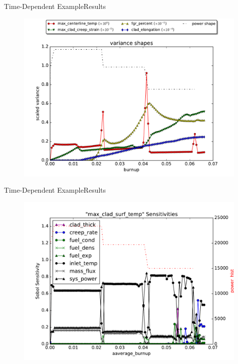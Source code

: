 \documentclass{beamer}
\begin{document}
\begin{frame}{Time-Dependent Example}{Results}\vspace{-20pt}
      \begin{figure}
        \centering
        \includegraphics[width=0.8\linewidth]{oecd/varplots}
      \end{figure}
\end{frame}

\begin{frame}{Time-Dependent Example}{Results}\vspace{-20pt}
      \begin{figure}
        \centering
        \includegraphics[width=0.8\linewidth]{oecd/sens_max_clad_surf_temp}
      \end{figure}
\end{frame}
\end{document}
